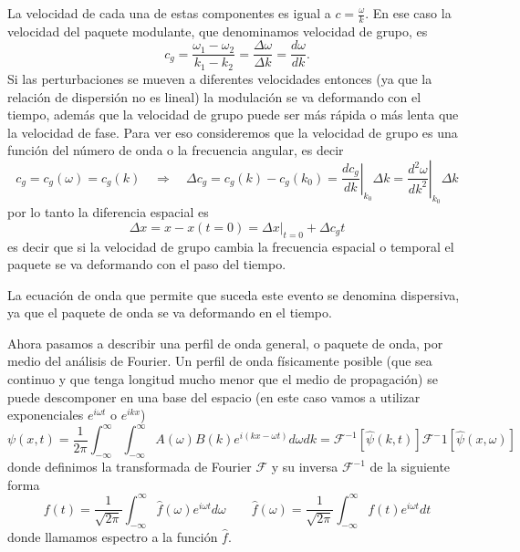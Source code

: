 \documentclass[a4paper]{article}
\numberwithin{equation}{section}
\begin{document}
			La velocidad de cada una de estas componentes es igual a $c = \frac{\omega}{k}$. En ese caso la velocidad del paquete modulante, que denominamos velocidad de grupo, es
			\begin{equation}
				c_g = \frac{\omega_1 - \omega_2}{k_1 - k_2} = \frac{\Delta \omega}{\Delta k} = \frac{d \omega}{d k}.
				\label{eq:ondas_paquetes_velocidad_grupo}
			\end{equation}
			Si las perturbaciones se mueven a diferentes velocidades entonces (ya que la relación de dispersión no es lineal) la modulación se va deformando con el tiempo, además que la velocidad de grupo puede ser más rápida o más lenta que la velocidad de fase. Para ver eso consideremos que la velocidad de grupo es una función del número de onda o la frecuencia angular, es decir
			\[ c_g = c_g(\omega) = c_g(k) \quad \Rightarrow \quad \Delta c_g = c_g(k) - c_g(k_0) = \left.\frac{d c_g}{d k}\right|_{k_0} \Delta k = \left.\frac{d^2 \omega}{d k^2}\right|_{k_0}  \Delta k\]
			por lo tanto la diferencia espacial es
			\[ \Delta x = x - x(t=0) = \left.\Delta x\right|_{t = 0} + \Delta c_g t\]
			es decir que si la velocidad de grupo cambia la frecuencia espacial o temporal el paquete se va deformando con el paso del tiempo.
			
			La ecuación de onda que permite que suceda este evento se denomina dispersiva, ya que el paquete de onda se va deformando en el tiempo.
			
			Ahora pasamos a describir una perfil de onda general, o paquete de onda, por medio del análisis de Fourier. Un perfil de onda físicamente posible (que sea continuo y que tenga longitud mucho menor que el medio de propagación) se puede descomponer en una base del espacio (en este caso vamos a utilizar exponenciales $e^{i \omega t}$ o $e^{i k x}$)
			\begin{equation}
				\psi(x,t) = \frac{1}{2\pi} \int_{-\infty}^{\infty}\int_{-\infty}^{\infty} A(\omega) B(k) e^{i(k x - \omega t)} d\omega dk = \mathcal{F}^{-1}[\hat{\psi}(k,t)] \mathcal{F}^-1[\hat{\psi}(x,\omega)]
				\label{eq:ondas_paquetes_fourier_general}
			\end{equation}
			donde definimos la transformada de Fourier $\mathcal{F}$ y su inversa $\mathcal{F}^{-1}$ de la siguiente forma
			\begin{equation}
				f(t) = \frac{1}{\sqrt{2 \pi}} \int_{-\infty}^{\infty} \hat{f}(\omega) e^{i \omega t} d\omega \qquad \hat{f}(\omega) = \frac{1}{\sqrt{2 \pi}} \int_{-\infty}^{\infty} f(t) e^{i \omega t} dt
				\label{eq:ondas_paquetes_fourier_def}
			\end{equation}
			donde llamamos espectro a la función $\hat{f}$. 
			
\end{document}
